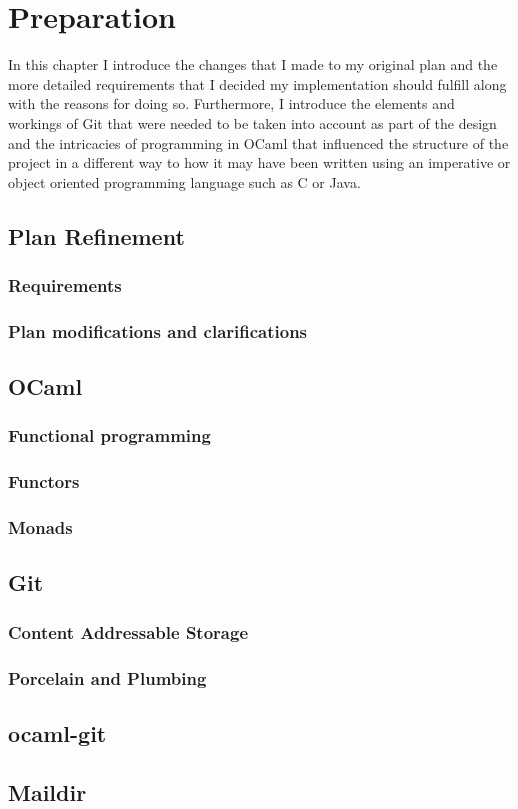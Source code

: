 \chapter{Preparation}

In this chapter I introduce the changes that I made to my original plan and the more detailed requirements that I decided my implementation should fulfill along with the reasons for doing so. Furthermore, I introduce the elements and workings of Git that were needed to be taken into account as part of the design and the intricacies of programming in OCaml that influenced the structure of the project in a different way to how it may have been written using an imperative or object oriented programming language such as C or Java.

\section{Plan Refinement}

\subsection{Requirements}

\subsection{Plan modifications and clarifications}

\section{OCaml}

\subsection{Functional programming}

\subsection{Functors}

\subsection{Monads}

\section{Git}

\subsection{Content Addressable Storage}

\subsection{Porcelain and Plumbing}

\section{ocaml-git}

\section{Maildir}
